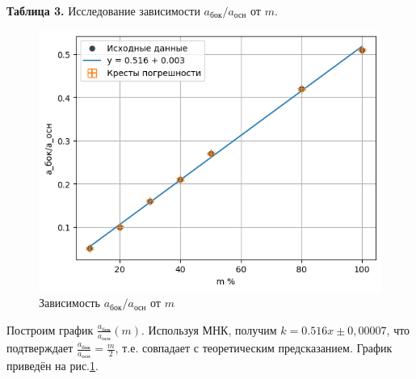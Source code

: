 \documentclass[a4paper,12pt]{article} %
\begin{document}
\begin{enumerate}
\begin{center}
		      \textbf{Таблица 3.} Исследование зависимости $a_{\text{бок}}/a_{\text{осн}}$ от $m$.
	      \end{center}
	      \begin{figure}[h]
		      \centering
		      \includegraphics[width=0.7\linewidth]{grafic3.png}
		      \caption{Зависимость $a_{\text{бок}}/a_{\text{осн}}$ от $m$}
		      \label{grafic3}
	      \end{figure}
	      Построим график $\frac{a_{\text{бок}}}{a_{\text{осн}}}(m)$. Используя МНК, получим $k=0.516x\pm0,00007$, что подтверждает $\frac{a_{\text{бок}}}{a_{\text{осн}}}=\frac{m}{2}$, т.е. совпадает с теоретическим предсказанием. График приведён на рис.\ref{grafic3}.




\end{enumerate}

















\end{document}
